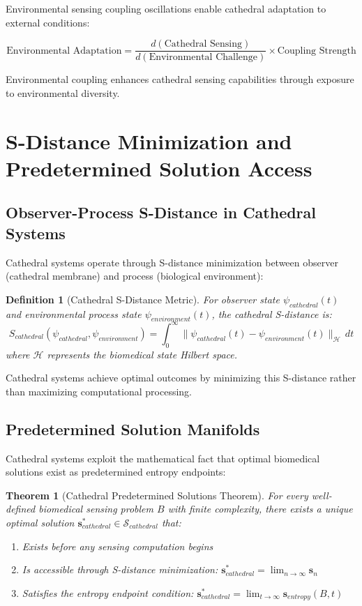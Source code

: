 \documentclass[12pt,a4paper]{article}
\newtheorem{theorem}{Theorem}
\newtheorem{definition}{Definition}
\begin{document}
Environmental sensing coupling oscillations enable cathedral adaptation to external conditions:

\begin{equation}
\text{Environmental Adaptation} = \frac{d(\text{Cathedral Sensing})}{d(\text{Environmental Challenge})} \times \text{Coupling Strength}
\end{equation}

Environmental coupling enhances cathedral sensing capabilities through exposure to environmental diversity.

\section{S-Distance Minimization and Predetermined Solution Access}

\subsection{Observer-Process S-Distance in Cathedral Systems}

Cathedral systems operate through S-distance minimization between observer (cathedral membrane) and process (biological environment):

\begin{definition}[Cathedral S-Distance Metric]
For observer state $\psi_{cathedral}(t)$ and environmental process state $\psi_{environment}(t)$, the cathedral S-distance is:
\begin{equation}
S_{cathedral}(\psi_{cathedral}, \psi_{environment}) = \int_0^{\infty} \|\psi_{cathedral}(t) - \psi_{environment}(t)\|_{\mathcal{H}} \, dt
\end{equation}
where $\mathcal{H}$ represents the biomedical state Hilbert space.
\end{definition}

Cathedral systems achieve optimal outcomes by minimizing this S-distance rather than maximizing computational processing.

\subsection{Predetermined Solution Manifolds}

Cathedral systems exploit the mathematical fact that optimal biomedical solutions exist as predetermined entropy endpoints:

\begin{theorem}[Cathedral Predetermined Solutions Theorem]
For every well-defined biomedical sensing problem $B$ with finite complexity, there exists a unique optimal solution $\mathbf{s}_{cathedral}^* \in \mathcal{S}_{cathedral}$ that:
\begin{enumerate}
\item Exists before any sensing computation begins
\item Is accessible through S-distance minimization: $\mathbf{s}_{cathedral}^* = \lim_{n \to \infty} \mathbf{s}_n$
\item Satisfies the entropy endpoint condition: $\mathbf{s}_{cathedral}^* = \lim_{t \to \infty} \mathbf{s}_{entropy}(B, t)$
\end{enumerate}
\end{theorem}
\end{document}
